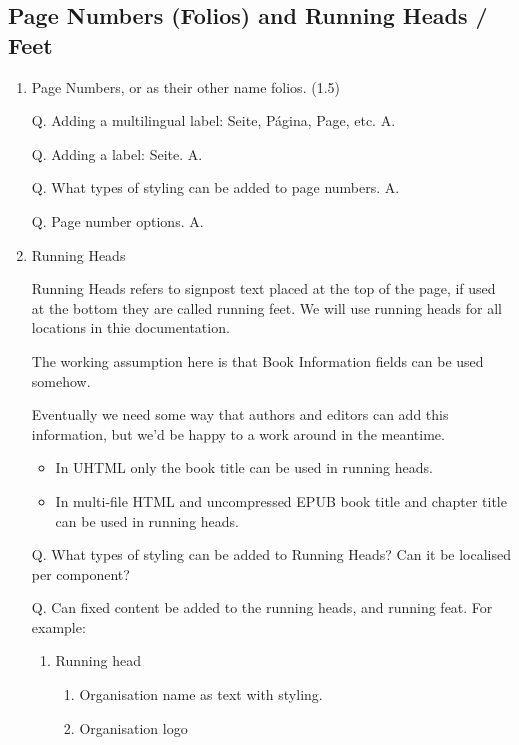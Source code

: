 \documentclass{article}
\begin{document}
\subsection{Page Numbers (Folios) and Running Heads / Feet}\label{H6636642}


\begin{enumerate}
\item Page Numbers, or as their other name folios. (1.5)


Q. Adding a multilingual label: Seite, Página, Page, etc. A. 


Q. Adding a label: Seite. A. 


Q. What types of styling can be added to page numbers. A. 


Q. Page number options. A.


\item Running Heads


Running Heads refers to signpost text placed at the top of the page, if used at the bottom they are called running feet. We will use running heads for all locations in thie documentation.  


The working assumption here is that Book Information fields can be used somehow.


Eventually we need some way that authors and editors can add this information, but we'd be happy to a work around in the meantime.

\begin{itemize}
\item In UHTML only the book title can be used in running heads.


\item In multi-file HTML and uncompressed EPUB book title and chapter title can be used in running heads.


\end{itemize}

Q. What types of styling can be added to Running Heads? Can it be localised per component?


Q. Can fixed content be added to the running heads, and running feat. For example:

\begin{enumerate}
\item Running head

\begin{enumerate}
\item Organisation name as text with styling.


\item Organisation logo



\end{enumerate}
\end{enumerate}
\end{enumerate}
\end{document}
